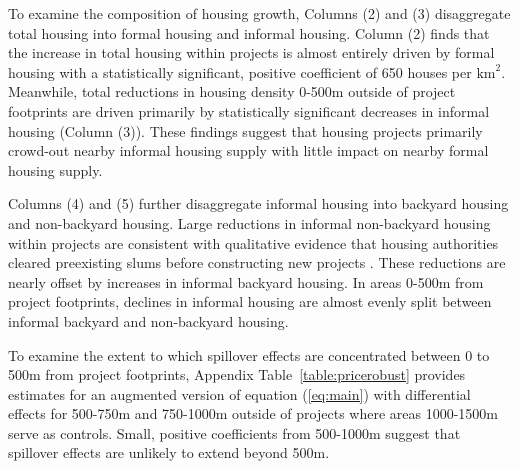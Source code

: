 \documentclass[12pt]{article}
\begin{document}








To examine the composition of housing growth, Columns (2) and (3) disaggregate total housing into formal housing and informal housing.  Column (2) finds that the increase in total housing within projects is almost entirely driven by formal housing with a statistically significant, positive coefficient of 650 houses per $\text{km}^{2}$.  Meanwhile, total reductions in housing density 0-500m outside of project footprints are driven primarily by statistically significant decreases in informal housing (Column (3)).  These findings suggest that housing projects primarily crowd-out nearby informal housing supply with little impact on nearby formal housing supply.


Columns (4) and (5) further disaggregate informal housing into backyard housing and non-backyard housing.  Large reductions in informal non-backyard housing within projects are consistent with qualitative evidence that housing authorities cleared preexisting slums before constructing new projects \citep{hofmeyr2008risk}.  These reductions are nearly offset by increases in informal backyard housing.  In areas 0-500m from project footprints, declines in informal housing are almost evenly split between informal backyard and non-backyard housing.

To examine the extent to which spillover effects are concentrated between 0 to 500m from project footprints, Appendix Table~\ref{table:pricerobust} provides estimates for an augmented version of equation (\ref{eq:main}) with differential effects for 500-750m and 750-1000m outside of projects where areas 1000-1500m serve as controls.  Small, positive coefficients from 500-1000m suggest that spillover effects are unlikely to extend beyond 500m.  
\end{document}
